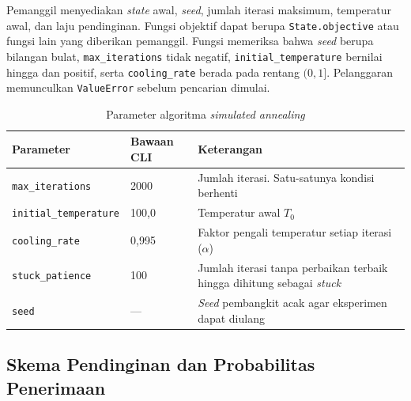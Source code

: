 Pemanggil menyediakan \textit{state} awal, \textit{seed}, jumlah iterasi maksimum, temperatur awal, dan laju pendinginan. Fungsi objektif dapat berupa \texttt{State.objective} atau fungsi lain yang diberikan pemanggil. Fungsi memeriksa bahwa \textit{seed} berupa bilangan bulat, \texttt{max\_iterations} tidak negatif, \texttt{initial\_temperature} bernilai hingga dan positif, serta \texttt{cooling\_rate} berada pada rentang $(0,1]$. Pelanggaran memunculkan \texttt{ValueError} sebelum pencarian dimulai.

\begin{table}[h]
    \centering
    \begin{tabular}{@{}p{4.7cm}p{2.3cm}p{6.5cm}@{}}
        \toprule
        Parameter                     & Bawaan CLI & Keterangan                                                                    \\
        \midrule
        \texttt{max\_iterations}      & 2000       & Jumlah iterasi. Satu-satunya kondisi berhenti                                 \\
        \texttt{initial\_temperature} & 100,0      & Temperatur awal $T_0$                                                         \\
        \texttt{cooling\_rate}        & 0,995      & Faktor pengali temperatur setiap iterasi ($\alpha$)                           \\
        \texttt{stuck\_patience}      & 100        & Jumlah iterasi tanpa perbaikan terbaik hingga dihitung sebagai \textit{stuck} \\
        \texttt{seed}                 & ---        & \textit{Seed} pembangkit acak agar eksperimen dapat diulang                   \\
        \bottomrule
    \end{tabular}
    \caption{Parameter algoritma \textit{simulated annealing}}
\end{table}

\subsection{Skema Pendinginan dan Probabilitas Penerimaan}

